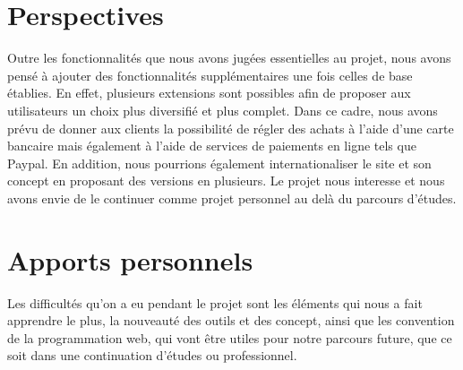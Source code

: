 \documentclass[a4paper,12pt]{report}
\theoremstyle{break}
\theoremstyle{break}
\theoremstyle{break}
\theoremstyle{break}
\theoremstyle{definition}
\theoremstyle{remark}
\begin{document}
\section{Perspectives}
\label{sec:perspectives}
Outre les fonctionnalités que nous avons jugées essentielles au projet, nous avons pensé à ajouter
des fonctionnalités supplémentaires une fois celles de base établies. En effet, plusieurs extensions
sont possibles afin de proposer aux utilisateurs un choix plus diversifié et plus complet.
Dans ce cadre, nous avons prévu de donner aux clients la possibilité de régler des achats à l'aide
d'une carte bancaire mais également à l'aide de services de paiements en ligne tels que Paypal.
En addition, nous pourrions également internationaliser le site et son concept en proposant des versions
en plusieurs.
Le projet nous interesse et nous avons envie de le continuer comme projet personnel au delà du parcours d'études.
\section{Apports personnels}
Les difficultés qu'on a eu pendant le projet sont les éléments qui nous a fait apprendre le plus,
la nouveauté des outils et des concept, ainsi que les convention de la programmation web, qui vont être utiles pour
notre parcours future, que ce soit dans une continuation d'études ou professionnel.

\begin{appendices}
\end{appendices}


\end{document}
